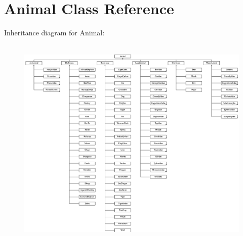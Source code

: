 \hypertarget{class_animal}{}\section{Animal Class Reference}
\label{class_animal}
Inheritance diagram for Animal\+:\begin{figure}[H]
\begin{center}
\leavevmode
\includegraphics[height=10.327868cm]{class_animal}
\end{center}
\end{figure}
